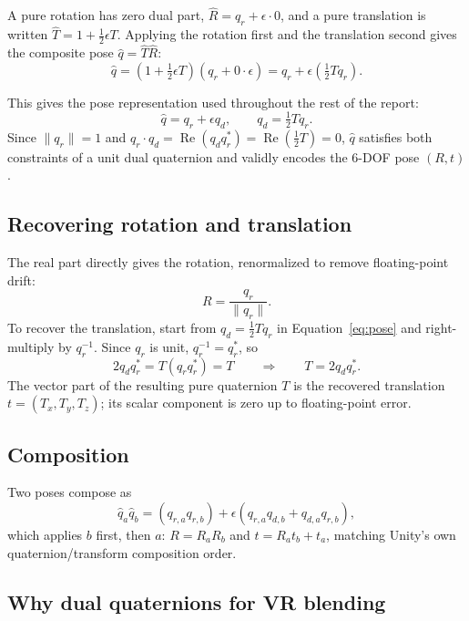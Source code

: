 \documentclass[11pt]{article}
\begin{document}
A pure rotation has zero dual part, $\hat R = q_r + \epsilon \cdot 0$, and a
pure translation is written $\hat T = 1 + \tfrac{1}{2}\epsilon T$. Applying the
rotation first and the translation second gives the composite pose
$\hat q = \hat T \hat R$:
\[
\hat{q} = \left(1 + \tfrac{1}{2}\epsilon T\right)(q_r + 0\cdot\epsilon)
        = q_r + \epsilon\left(\tfrac{1}{2} T q_r\right).
\]

This gives the pose representation used throughout the rest of the report:
\begin{equation}
\hat{q} = q_r + \epsilon q_d, \qquad q_d = \tfrac{1}{2} T q_r.
\label{eq:pose}
\end{equation}
Since $\lVert q_r \rVert = 1$ and $q_r \cdot q_d = \operatorname{Re}(q_d q_r^{*})
= \operatorname{Re}(\tfrac12 T) = 0$, $\hat q$ satisfies both constraints of a
unit dual quaternion and validly encodes the 6-DOF pose $(R, t)$.

\subsection{Recovering rotation and translation}

The real part directly gives the rotation, renormalized to remove
floating-point drift:
\[
R = \frac{q_r}{\lVert q_r \rVert}.
\]
To recover the translation, start from $q_d = \tfrac12 T q_r$ in
Equation~\eqref{eq:pose} and right-multiply by $q_r^{-1}$. Since $q_r$ is
unit, $q_r^{-1} = q_r^{*}$, so
\[
2 q_d q_r^{*} = T (q_r q_r^{*}) = T
\qquad\Longrightarrow\qquad
T = 2 q_d q_r^{*}.
\]
The vector part of the resulting pure quaternion $T$ is the recovered
translation $t = (T_x, T_y, T_z)$; its scalar component is zero up to
floating-point error.

\subsection{Composition}

Two poses compose as
\[
\hat{q}_a \hat{q}_b = (q_{r,a} q_{r,b}) + \epsilon (q_{r,a} q_{d,b} + q_{d,a} q_{r,b}),
\]
which applies $b$ first, then $a$: $R = R_a R_b$ and $t = R_a t_b + t_a$,
matching Unity's own quaternion/transform composition order.

\subsection{Why dual quaternions for VR blending}
\end{document}
